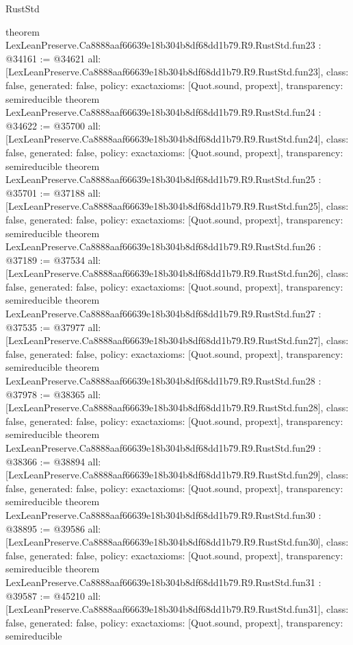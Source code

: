 \begin{lexlean}{RustStd}
\begin{coremodule}
{}
theorem LexLeanPreserve.Ca8888aaf66639e18b304b8df68dd1b79.R9.RustStd.fun23 : @34161 := @34621 {
  all: [LexLeanPreserve.Ca8888aaf66639e18b304b8df68dd1b79.R9.RustStd.fun23],
  class: false,
  generated: false,
  policy: exact{axioms: [Quot.sound, propext]},
  transparency: semireducible
}
theorem LexLeanPreserve.Ca8888aaf66639e18b304b8df68dd1b79.R9.RustStd.fun24 : @34622 := @35700 {
  all: [LexLeanPreserve.Ca8888aaf66639e18b304b8df68dd1b79.R9.RustStd.fun24],
  class: false,
  generated: false,
  policy: exact{axioms: [Quot.sound, propext]},
  transparency: semireducible
}
theorem LexLeanPreserve.Ca8888aaf66639e18b304b8df68dd1b79.R9.RustStd.fun25 : @35701 := @37188 {
  all: [LexLeanPreserve.Ca8888aaf66639e18b304b8df68dd1b79.R9.RustStd.fun25],
  class: false,
  generated: false,
  policy: exact{axioms: [Quot.sound, propext]},
  transparency: semireducible
}
theorem LexLeanPreserve.Ca8888aaf66639e18b304b8df68dd1b79.R9.RustStd.fun26 : @37189 := @37534 {
  all: [LexLeanPreserve.Ca8888aaf66639e18b304b8df68dd1b79.R9.RustStd.fun26],
  class: false,
  generated: false,
  policy: exact{axioms: [Quot.sound, propext]},
  transparency: semireducible
}
theorem LexLeanPreserve.Ca8888aaf66639e18b304b8df68dd1b79.R9.RustStd.fun27 : @37535 := @37977 {
  all: [LexLeanPreserve.Ca8888aaf66639e18b304b8df68dd1b79.R9.RustStd.fun27],
  class: false,
  generated: false,
  policy: exact{axioms: [Quot.sound, propext]},
  transparency: semireducible
}
theorem LexLeanPreserve.Ca8888aaf66639e18b304b8df68dd1b79.R9.RustStd.fun28 : @37978 := @38365 {
  all: [LexLeanPreserve.Ca8888aaf66639e18b304b8df68dd1b79.R9.RustStd.fun28],
  class: false,
  generated: false,
  policy: exact{axioms: [Quot.sound, propext]},
  transparency: semireducible
}
theorem LexLeanPreserve.Ca8888aaf66639e18b304b8df68dd1b79.R9.RustStd.fun29 : @38366 := @38894 {
  all: [LexLeanPreserve.Ca8888aaf66639e18b304b8df68dd1b79.R9.RustStd.fun29],
  class: false,
  generated: false,
  policy: exact{axioms: [Quot.sound, propext]},
  transparency: semireducible
}
theorem LexLeanPreserve.Ca8888aaf66639e18b304b8df68dd1b79.R9.RustStd.fun30 : @38895 := @39586 {
  all: [LexLeanPreserve.Ca8888aaf66639e18b304b8df68dd1b79.R9.RustStd.fun30],
  class: false,
  generated: false,
  policy: exact{axioms: [Quot.sound, propext]},
  transparency: semireducible
}
theorem LexLeanPreserve.Ca8888aaf66639e18b304b8df68dd1b79.R9.RustStd.fun31 : @39587 := @45210 {
  all: [LexLeanPreserve.Ca8888aaf66639e18b304b8df68dd1b79.R9.RustStd.fun31],
  class: false,
  generated: false,
  policy: exact{axioms: [Quot.sound, propext]},
  transparency: semireducible
}
\end{coremodule}
\end{lexlean}
